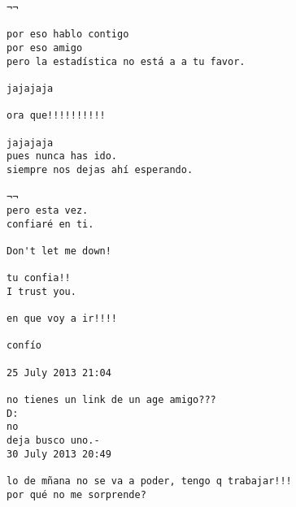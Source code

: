 \begin{verbatim}
¬¬

por eso hablo contigo
por eso amigo 
pero la estadística no está a a tu favor.

jajajaja

ora que!!!!!!!!!!

jajajaja
pues nunca has ido.
siempre nos dejas ahí esperando.

¬¬
pero esta vez.
confiaré en ti.

Don't let me down!

tu confia!! 
I trust you.

en que voy a ir!!!!

confío

25 July 2013 21:04

no tienes un link de un age amigo???
D:
no
deja busco uno.-
30 July 2013 20:49

lo de mñana no se va a poder, tengo q trabajar!!!
por qué no me sorprende?
\end{verbatim}
